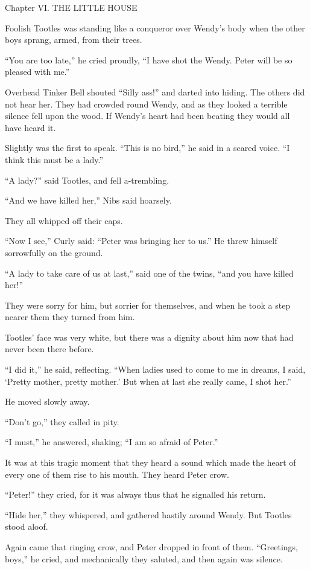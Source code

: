 Chapter VI.
THE LITTLE HOUSE


Foolish Tootles was standing like a conqueror over Wendy's body when
the other boys sprang, armed, from their trees.

``You are too late,'' he cried proudly, ``I have shot the Wendy. Peter
will be so pleased with me.''

Overhead Tinker Bell shouted ``Silly ass!'' and darted into hiding. The
others did not hear her. They had crowded round Wendy, and as they
looked a terrible silence fell upon the wood. If Wendy's heart had been
beating they would all have heard it.

Slightly was the first to speak. ``This is no bird,'' he said in a scared
voice. ``I think this must be a lady.''

``A lady?'' said Tootles, and fell a-trembling.

``And we have killed her,'' Nibs said hoarsely.

They all whipped off their caps.

``Now I see,'' Curly said: ``Peter was bringing her to us.'' He threw
himself sorrowfully on the ground.

``A lady to take care of us at last,'' said one of the twins, ``and you
have killed her!''

They were sorry for him, but sorrier for themselves, and when he took a
step nearer them they turned from him.

Tootles' face was very white, but there was a dignity about him now
that had never been there before.

``I did it,'' he said, reflecting. ``When ladies used to come to me in
dreams, I said, ‘Pretty mother, pretty mother.' But when at last she
really came, I shot her.''

He moved slowly away.

``Don't go,'' they called in pity.

``I must,'' he answered, shaking; ``I am so afraid of Peter.''

It was at this tragic moment that they heard a sound which made the
heart of every one of them rise to his mouth. They heard Peter crow.

``Peter!'' they cried, for it was always thus that he signalled his
return.

``Hide her,'' they whispered, and gathered hastily around Wendy. But
Tootles stood aloof.

Again came that ringing crow, and Peter dropped in front of them.
``Greetings, boys,'' he cried, and mechanically they saluted, and then
again was silence.

